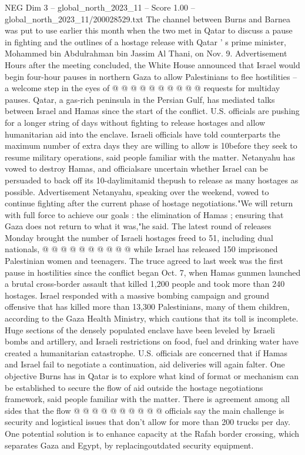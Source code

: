 \begin{textsample}{NEG Dim 3 – global\_north\_2023\_11 – Score 1.00 – global\_north\_2023\_11/200028529.txt}
The channel between Burns and Barnea was put to use earlier this month when the two met in Qatar to discuss a pause in fighting and the outlines of a hostage release with Qatar ' s prime minister, Mohammed bin Abdulrahman bin Jassim Al Thani, on Nov. 9.
Advertisement Hours after the meeting concluded, the White House announced that Israel would begin four-hour pauses in northern Gaza to allow Palestinians to flee hostilities -- a welcome step in the eyes of @ @ @ @ @ @ @ @ @ @ requests for multiday pauses.
Qatar, a gas-rich peninsula in the Persian Gulf, has mediated talks between Israel and Hamas since the start of the conflict.
U.S. officials are pushing for a longer string of days without fighting to release hostages and allow humanitarian aid into the enclave.
Israeli officials have told counterparts the maximum number of extra days they are willing to allow is 10before they seek to resume military operations, said people familiar with the matter.
Netanyahu has vowed to destroy Hamas, and officialsare uncertain whether Israel can be persuaded to back off its 10-daylimitamid thepush to release as many hostages as possible.
Advertisement Netanyahu, speaking over the weekend, vowed to continue fighting after the current phase of hostage negotiations."We will return with full force to achieve our goals : the elimination of Hamas ; ensuring that Gaza does not return to what it was,"he said.
The latest round of releases Monday brought the number of Israeli hostages freed to 51, including dual nationals, @ @ @ @ @ @ @ @ @ @ while Israel has released 150 imprisoned Palestinian women and teenagers.
The truce agreed to last week was the first pause in hostilities since the conflict began Oct. 7, when Hamas gunmen launched a brutal cross-border assault that killed 1,200 people and took more than 240 hostages.
Israel responded with a massive bombing campaign and ground offensive that has killed more than 13,300 Palestinians, many of them children, according to the Gaza Health Ministry, which cautions that its toll is incomplete.
Huge sections of the densely populated enclave have been leveled by Israeli bombs and artillery, and Israeli restrictions on food, fuel and drinking water have created a humanitarian catastrophe.
U.S. officials are concerned that if Hamas and Israel fail to negotiate a continuation, aid deliveries will again falter.
One objective Burns has in Qatar is to explore what kind of format or mechanism can be established to secure the flow of aid outside the hostage negotiations framework, said people familiar with the matter.
There is agreement among all sides that the flow @ @ @ @ @ @ @ @ @ @ officials say the main challenge is security and logistical issues that don't allow for more than 200 trucks per day.
One potential solution is to enhance capacity at the Rafah border crossing, which separates Gaza and Egypt, by replacingoutdated security equipment.

\end{textsample}
